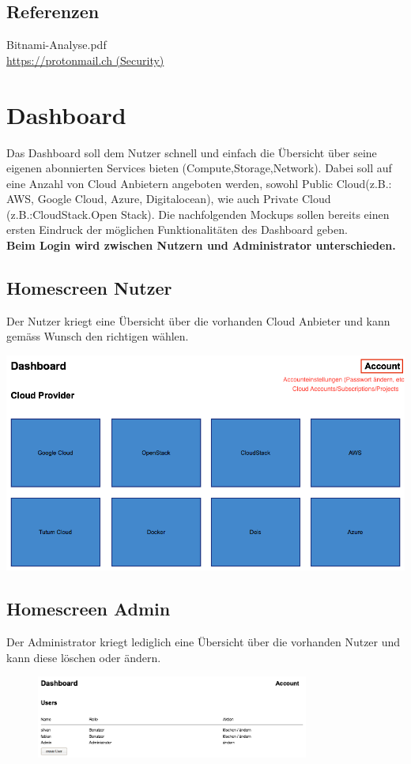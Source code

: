 

\subsection{Referenzen}
Bitnami-Analyse.pdf\\
\href{https://protonmail.ch}{https://protonmail.ch (Security)} 

\section{Dashboard}
Das Dashboard soll dem Nutzer schnell und einfach die Übersicht über seine 
eigenen abonnierten Services bieten (Compute,Storage,Network).
Dabei soll auf eine Anzahl von Cloud Anbietern angeboten werden, sowohl Public 
Cloud(z.B.: AWS, Google Cloud, Azure, Digitalocean), wie auch Private Cloud (z.B.:CloudStack.Open 
Stack).
Die nachfolgenden Mockups sollen bereits einen ersten Eindruck der 
möglichen Funktionalitäten des Dashboard geben.
\\
\textbf{Beim Login wird zwischen Nutzern und Administrator unterschieden.}

\subsection{Homescreen Nutzer}
Der Nutzer kriegt eine Übersicht über die vorhanden Cloud Anbieter und kann 
gemäss Wunsch den richtigen wählen.

\includegraphics[width=\textwidth]{./03_Analyse/03_Dashboard/images/homescreen_user}

\subsection{Homescreen Admin}

Der Administrator kriegt lediglich eine Übersicht über die vorhanden Nutzer und 
kann diese löschen oder ändern.
\begin{figure}[h]
  \includegraphics[width=0.8\textwidth]{./03_Analyse/03_Dashboard/images/homescreen_admin}
\end{figure}


